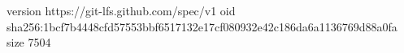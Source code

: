 version https://git-lfs.github.com/spec/v1
oid sha256:1bcf7b4448cfd57553bbf6517132e17cf080932e42c186da6a1136769d88a0fa
size 7504
